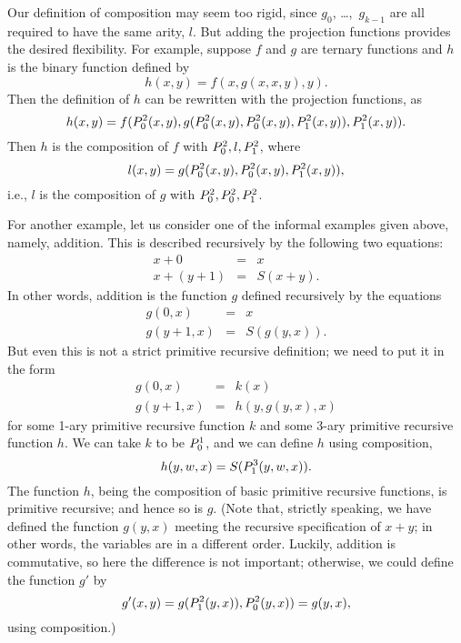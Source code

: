 \documentclass[../../../include/open-logic-section]{subfiles}
\begin{document}
Our definition of composition may seem too rigid, since
$g_0$, \dots,~$g_{k-1}$ are all required to have the same arity, $l$. But
adding the projection functions provides the desired flexibility. For
example, suppose $f$ and $g$ are ternary functions and $h$ is the
binary function defined by
\[
h(x,y) = f(x,g(x,x,y),y).
\]
Then the definition of $h$ can be rewritten with the projection
functions, as
\[
h(x,y) = f(P^{2}_{0}(x,y), g(P^{2}_{0}(x,y), P^{2}_{0}(x,y),
P^{2}_{1}(x,y)), P^{2}_{1}(x,y)).
\]
Then $h$ is the composition of $f$ with $P^{2}_{0},l,P^{2}_{1}$, where
\[
l(x,y) = g(P^{2}_{0}(x,y),P^{2}_{0}(x,y),P^{2}_{1}(x,y)),
\]
i.e., $l$ is the composition of $g$ with $P^{2}_{0},P^{2}_{0},P^{2}_{1}$.

For another example, let us consider one of the informal examples
given above, namely, addition. This is
described recursively by the following two equations:
\begin{eqnarray*}
x + 0 & = & x \\
x + (y+1) & = & S(x+y).
\end{eqnarray*}
In other words, addition is the function $g$ defined recursively by
the equations
\begin{eqnarray*}
g(0,x) & = & x \\
g(y+1,x) & = & S(g(y,x)).
\end{eqnarray*}
But even this is not a strict primitive recursive definition; we need
to put it in the form
\begin{eqnarray*}
g(0,x) & = & k(x) \\
g(y+1,x) & = & h(y,g(y,x),x)
\end{eqnarray*}
for some 1-ary primitive recursive function $k$ and some 3-ary
primitive recursive function $h$. We can take $k$ to be $P^{1}_{0}$, and
we can define $h$ using composition,
\[
h(y,w,x) = S(P^{3}_{1}(y,w,x)).
\]
The function $h$, being the composition of basic primitive recursive
functions, is primitive recursive; and hence so is $g$. (Note that,
strictly speaking, we have defined the function $g(y,x)$ meeting the
recursive specification of $x + y$; in other words, the variables are
in a different order. Luckily, addition is commutative, so here the
difference is not important; otherwise, we could define the function
$g'$ by
\[
g'(x,y) = g(P^{2}_{1}(y,x)),P^{2}_{0}(y,x)) = g(y,x),
\]
using composition.)
\end{document}
